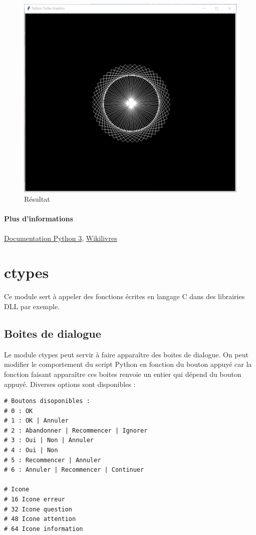 \documentclass[a4paper, 10pt]{article}
\begin{document}
\begin{figure}[h]
\begin{center}
\includegraphics[scale=0.5]{turtle.PNG}
\caption*{Résultat}
\end{center}
\end{figure}

\paragraph{Plus d'informations} \href{https://docs.python.org/fr/3.6/library/turtle.html#methods-specific-to-screen-not-inherited-from-turtlescreen}{Documentation Python 3}, \href{https://fr.wikibooks.org/wiki/Programmation_Python/Turtle}{Wikilivres}

\section{ctypes}
 Ce module sert à appeler des fonctions écrites en langage C dans des librairies DLL par exemple.
\subsection{Boites de dialogue}
 Le module ctypes peut servir à faire apparaître des boites de dialogue. On peut modifier le comportement du script Python en fonction du bouton appuyé car la fonction faisant apparaître ces boites renvoie un entier qui dépend du bouton appuyé. Diverses options sont disponibles :
\begin{verbatim}
# Boutons disoponibles :
# 0 : OK
# 1 : OK | Annuler
# 2 : Abandonner | Recommencer | Ignorer
# 3 : Oui | Non | Annuler
# 4 : Oui | Non
# 5 : Recommencer | Annuler
# 6 : Annuler | Recommencer | Continuer

# Icone
# 16 Icone erreur
# 32 Icone question
# 48 Icone attention
# 64 Icone information
\end{verbatim}
\end{document}
